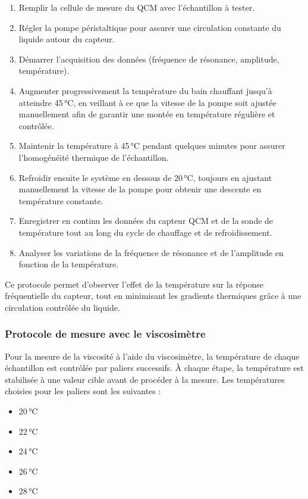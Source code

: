 \begin{enumerate}
    \item Remplir la cellule de mesure du QCM avec l'échantillon à tester.
    \item Régler la pompe péristaltique pour assurer une circulation constante du liquide autour du capteur.
    \item Démarrer l'acquisition des données (fréquence de résonance, amplitude, température).
    \item Augmenter progressivement la température du bain chauffant jusqu'à atteindre 45 °C, en veillant à ce que la vitesse de la pompe soit ajustée manuellement afin de garantir une montée en température régulière et contrôlée.
    \item Maintenir la température à 45 °C pendant quelques minutes pour assurer l'homogénéité thermique de l'échantillon.
    \item Refroidir ensuite le système en dessous de 20 °C, toujours en ajustant manuellement la vitesse de la pompe pour obtenir une descente en température constante.
    \item Enregistrer en continu les données du capteur QCM et de la sonde de température tout au long du cycle de chauffage et de refroidissement.
    \item Analyser les variations de la fréquence de résonance et de l'amplitude en fonction de la température.
\end{enumerate}

Ce protocole permet d'observer l'effet de la température sur la réponse fréquentielle du capteur, tout en minimisant les gradients thermiques grâce à une circulation contrôlée du liquide.

\subsubsection{Protocole de mesure avec le viscosimètre}

Pour la mesure de la viscosité à l'aide du viscosimètre, la température de chaque échantillon est contrôlée par paliers successifs. À chaque étape, la température est stabilisée à une valeur cible avant de procéder à la mesure. Les températures choisies pour les paliers sont les suivantes :
\begin{itemize}[label=\textbullet]
    \item 20 °C
    \item 22 °C
    \item 24 °C
    \item 26 °C
    \item 28 °C
\end{itemize}

